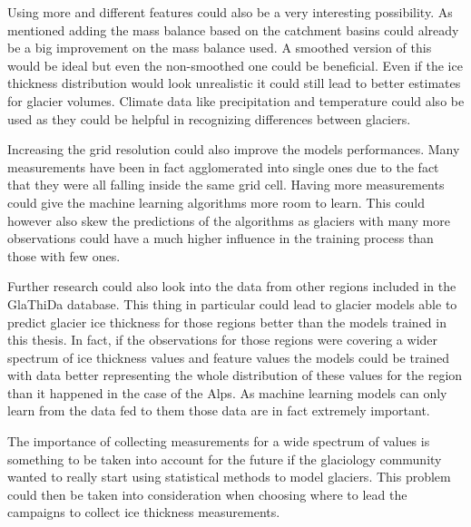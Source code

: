 Using more and different features could also be a very interesting possibility. As mentioned adding the mass balance based on the catchment basins could already be a big improvement on the mass balance used. A smoothed version of this would be ideal but even the non-smoothed one could be beneficial. Even if the ice thickness distribution would look unrealistic it could still lead to better estimates for glacier volumes. Climate data like precipitation and temperature could also be used as they could be helpful in recognizing differences between glaciers.

Increasing the grid resolution could also improve the models performances. Many measurements have been in fact agglomerated into single ones due to the fact that they were all falling inside the same grid cell. Having more measurements could give the machine learning algorithms more room to learn. This could however also skew the predictions of the algorithms as glaciers with many more observations could have a much higher influence in the training process than those with few ones. 
 
Further research could also look into the data from other regions included in the GlaThiDa database.  This thing in particular could lead to glacier models able to predict glacier ice thickness for those regions better than the models trained in this thesis. In fact, if the observations for those regions were covering a wider spectrum of ice thickness values and feature values the models could be trained with data better representing the whole distribution of these values for the region than it happened in the case of the Alps. As machine learning models can only learn from the data fed to them those data are in fact extremely important.
 
The importance of collecting measurements for a wide spectrum of values is something to be taken into account for the future if the glaciology community wanted to really start using statistical methods to model glaciers. This problem could then be taken into consideration when choosing where to lead the campaigns to collect ice thickness measurements.
